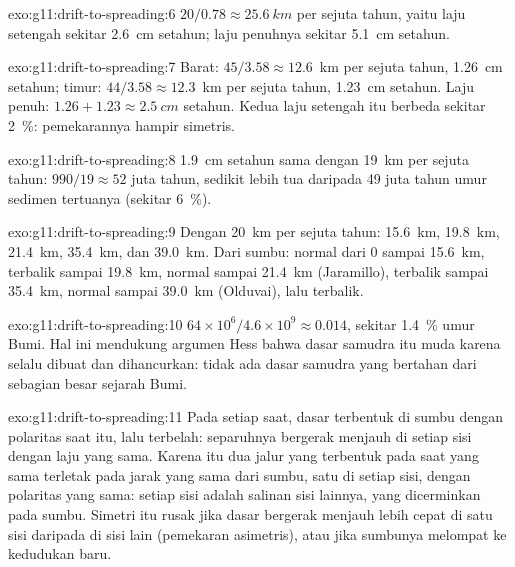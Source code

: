 \begin{solution}{exo:g11:drift-to-spreading:6}
$20/0.78 \approx \qty{25.6}{km}$ per sejuta tahun, yaitu laju setengah sekitar
\qty{2.6}{cm} setahun; laju penuhnya sekitar \qty{5.1}{cm} setahun.
\end{solution}

\begin{solution}{exo:g11:drift-to-spreading:7}
Barat: $45/3.58 \approx 12.6$~km per sejuta tahun, \qty{1.26}{cm} setahun;
timur: $44/3.58 \approx 12.3$~km per sejuta tahun, \qty{1.23}{cm} setahun.
Laju penuh: $1.26 + 1.23 \approx \qty{2.5}{cm}$ setahun. Kedua laju setengah
itu berbeda sekitar \qty{2}{\percent}: pemekarannya hampir simetris.
\end{solution}

\begin{solution}{exo:g11:drift-to-spreading:8}
\qty{1.9}{cm} setahun sama dengan \qty{19}{km} per sejuta tahun:
$990/19 \approx 52$ juta tahun, sedikit lebih tua daripada 49 juta tahun umur
sedimen tertuanya (sekitar \qty{6}{\percent}).
\end{solution}

\begin{solution}{exo:g11:drift-to-spreading:9}
Dengan \qty{20}{km} per sejuta tahun: \qty{15.6}{km}, \qty{19.8}{km},
\qty{21.4}{km}, \qty{35.4}{km}, dan \qty{39.0}{km}. Dari sumbu: normal dari 0
sampai \qty{15.6}{km}, terbalik sampai \qty{19.8}{km}, normal sampai
\qty{21.4}{km} (Jaramillo), terbalik sampai \qty{35.4}{km}, normal sampai
\qty{39.0}{km} (Olduvai), lalu terbalik.
\end{solution}

\begin{solution}{exo:g11:drift-to-spreading:10}
$64 \times 10^6/4.6 \times 10^9 \approx \num{0.014}$, sekitar
\qty{1.4}{\percent} umur Bumi. Hal ini mendukung argumen Hess bahwa dasar
samudra itu muda karena selalu dibuat dan dihancurkan: tidak ada dasar samudra
yang bertahan dari sebagian besar sejarah Bumi.
\end{solution}

\begin{solution}{exo:g11:drift-to-spreading:11}
Pada setiap saat, dasar terbentuk di sumbu dengan polaritas saat itu, lalu
terbelah: separuhnya bergerak menjauh di setiap sisi dengan laju yang sama.
Karena itu dua jalur yang terbentuk pada saat yang sama terletak pada jarak
yang sama dari sumbu, satu di setiap sisi, dengan polaritas yang sama: setiap
sisi adalah salinan sisi lainnya, yang dicerminkan pada sumbu. Simetri itu
rusak jika dasar bergerak menjauh lebih cepat di satu sisi daripada di sisi
lain (pemekaran asimetris), atau jika sumbunya melompat ke kedudukan baru.
\end{solution}

